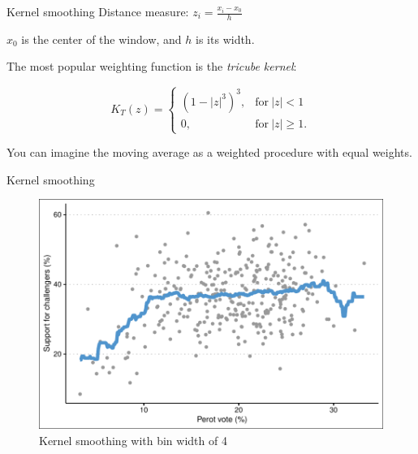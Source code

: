\documentclass[12pt,english,pdf,xcolor=dvipsnames,aspectratio=169,handout]{beamer}\usepackage[]{graphicx}\usepackage[]{xcolor}
\begin{document}
\begin{frame}{Kernel smoothing}
  Distance measure: $z_i = \frac{x_i - x_0}{h}$ \bigskip

  $x_0$ is the center of the window, and $h$ is its width.\bigskip
  
  The most popular weighting function is the \textit{tricube kernel}:

  \begin{equation}
    K_T(z) = \begin{cases}
      (1 - |z|^3)^3, & \text{for}\ |z| < 1 \\
       0, & \text{for}\ |z| \geq 1.
    \end{cases}
  \end{equation}

  You can imagine the moving average as a weighted procedure with equal weights.
  
\end{frame}



\begin{frame}{Kernel smoothing}



\begin{figure}
  \centering
  \includegraphics[scale=0.7]{../04-graphs/04-06}
  \caption{Kernel smoothing with bin width of 4}
\end{figure}

\end{frame}
\end{document}
